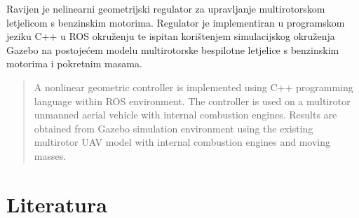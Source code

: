 \documentclass[times, utf8, diplomski]{fer}
\begin{document}
\begin{sazetak}
Ravijen je nelinearni geometrijski regulator za upravljanje multirotorskom letjelicom s benzinskim motorima. Regulator je implementiran u programskom jeziku C++ u ROS okruženju te ispitan korištenjem simulacijskog okruženja Gazebo na postojećem modelu multirotorske bespilotne letjelice s benzinskim motorima i pokretnim masama.

\end{sazetak}

\begin{abstract}
A nonlinear geometric controller is implemented using C++ programming language within ROS environment. The controller is used on a multirotor unmanned aerial vehicle with internal combustion engines. Results are obtained from Gazebo simulation environment using the existing multirotor UAV model with internal combustion engines and moving masses.

\end{abstract}





\chapter{Literatura}
\end{document}
